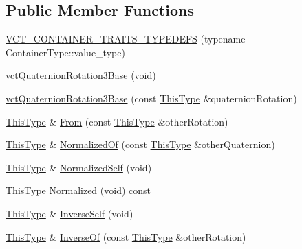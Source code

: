 \subsection*{Public Member Functions}
\begin{DoxyCompactItemize}
\item 
\hyperlink{classvct_quaternion_rotation3_base_af57e4c02fd70dc7ec1d58e0b44a624fd}{V\-C\-T\-\_\-\-C\-O\-N\-T\-A\-I\-N\-E\-R\-\_\-\-T\-R\-A\-I\-T\-S\-\_\-\-T\-Y\-P\-E\-D\-E\-F\-S} (typename Container\-Type\-::value\-\_\-type)
\item 
\hyperlink{classvct_quaternion_rotation3_base_a1dea4cd579703f66bf163b69bca5a96b}{vct\-Quaternion\-Rotation3\-Base} (void)
\item 
\hyperlink{classvct_quaternion_rotation3_base_a8376b96adbf771b1391074e1d2e58ad7}{vct\-Quaternion\-Rotation3\-Base} (const \hyperlink{classvct_quaternion_base_af28efdc38acf89acb7a67afada11408c}{This\-Type} \&quaternion\-Rotation)
\item 
\hyperlink{classvct_quaternion_base_af28efdc38acf89acb7a67afada11408c}{This\-Type} \& \hyperlink{classvct_quaternion_rotation3_base_a3a428d19b8f48077b8276997cfd60c93}{From} (const \hyperlink{classvct_quaternion_base_af28efdc38acf89acb7a67afada11408c}{This\-Type} \&other\-Rotation)
\item 
\hyperlink{classvct_quaternion_base_af28efdc38acf89acb7a67afada11408c}{This\-Type} \& \hyperlink{classvct_quaternion_rotation3_base_a2152103b5a4f8a92f397ba8aa2e9c3e1}{Normalized\-Of} (const \hyperlink{classvct_quaternion_base_af28efdc38acf89acb7a67afada11408c}{This\-Type} \&other\-Quaternion)
\item 
\hyperlink{classvct_quaternion_base_af28efdc38acf89acb7a67afada11408c}{This\-Type} \& \hyperlink{classvct_quaternion_rotation3_base_a83d65d4063a0bcd1db35fec895bb3793}{Normalized\-Self} (void)
\item 
\hyperlink{classvct_quaternion_base_af28efdc38acf89acb7a67afada11408c}{This\-Type} \hyperlink{classvct_quaternion_rotation3_base_a5eb2e79d6a9cd3993a847791760d0d7b}{Normalized} (void) const 
\item 
\hyperlink{classvct_quaternion_base_af28efdc38acf89acb7a67afada11408c}{This\-Type} \& \hyperlink{classvct_quaternion_rotation3_base_a0a94bc0c71fff5b80ae821faddbeaf4c}{Inverse\-Self} (void)
\item 
\hyperlink{classvct_quaternion_base_af28efdc38acf89acb7a67afada11408c}{This\-Type} \& \hyperlink{classvct_quaternion_rotation3_base_aa8b668cab41b415642137c6eb93508b9}{Inverse\-Of} (const \hyperlink{classvct_quaternion_base_af28efdc38acf89acb7a67afada11408c}{This\-Type} \&other\-Rotation)

\end{DoxyCompactItemize}
